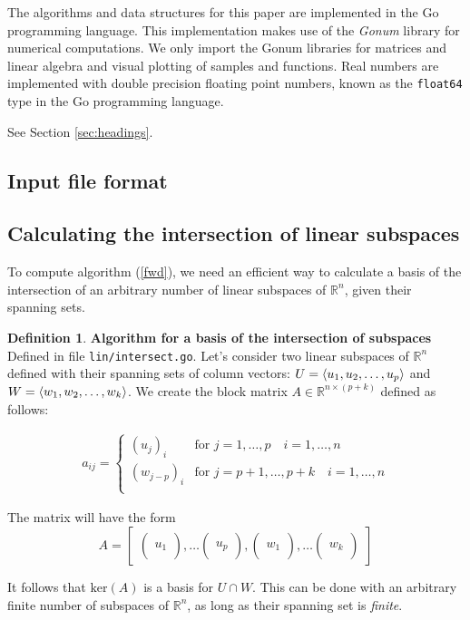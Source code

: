 \documentclass{article}
\theoremstyle{plain}%
\theoremstyle{definition}
\newtheorem{defn}{Definition}[section]
\theoremstyle{remark}
\def\R{\mathbb{R}}
\DeclarePairedDelimiter\spanset{\langle}{\rangle}
\newcommand{\mker}[1]{\text{ker}\left(#1\right)}
\newcommand{\vvvec}[3]{
	\begin{pmatrix}
		#1 \\ #2 \\ #3
	\end{pmatrix}
}
\begin{document}
The algorithms and data structures for this paper are implemented in the Go programming 
language. This implementation makes use of the \textit{Gonum} library for numerical 
computations. We only import the Gonum libraries for matrices and linear algebra 
and visual plotting of samples and functions.
Real numbers are implemented with double precision floating point numbers,  
known as the \texttt{float64} type in the Go programming language.




See Section \ref{sec:headings}.

\subsection{Input file format}

\subsection{Calculating the intersection of linear subspaces}

To compute algorithm (\ref{fwd}), we need an efficient way to calculate a basis 
of the intersection of an arbitrary number of linear subspaces of $\R^n$, given their 
spanning sets. 

\begin{defn}
  \textbf{Algorithm for a basis of the intersection of subspaces} \\
  Defined in file \texttt{lin/intersect.go}.
  Let's consider two linear subspaces of 
  $\R^n$ defined with their spanning sets of column vectors: 
  $U = \spanset{u_1, u_2, \hdots, u_p}$ 
  and $W = \spanset{w_1, w_2, \hdots, w_k}$.
  We create the block matrix $A \in \R^{n \times (p+k)}$ defined as follows:
  
  \begin{equation*}
    \begin{aligned}
      a_{ij} = \begin{cases}
        (u_j)_i & \text{for  } j = 1, \hdots, p \quad i = 1, \hdots, n \\
        (w_{j-p})_i & \text{for  } j = p+1, \hdots, p+k \quad i = 1, \hdots, n \\
      \end{cases}
    \end{aligned}
  \end{equation*}
  
  The matrix will have the form
  \begin{equation*}
    A = \begin{bmatrix}
      \vvvec{}{u_1}{\,}, \hdots \vvvec{}{u_p}{\,}, 
      \vvvec{}{w_1}{\,}, \hdots \vvvec{}{w_k}{\,} 
    \end{bmatrix}
  \end{equation*}

  It follows that $\mker{A}$ is a basis for $U \cap W$. This can be done with an 
  arbitrary finite number of subspaces of $\R^n$, as long as their spanning set is 
  \textit{finite}.
\end{defn}
\end{document}
